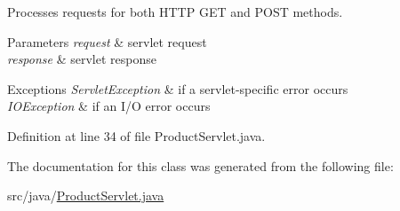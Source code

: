 Processes requests for both H\+T\+TP {\ttfamily G\+ET} and {\ttfamily P\+O\+ST} methods.


\begin{DoxyParams}{Parameters}
{\em request} & servlet request \\
\hline
{\em response} & servlet response \\
\hline
\end{DoxyParams}

\begin{DoxyExceptions}{Exceptions}
{\em Servlet\+Exception} & if a servlet-\/specific error occurs \\
\hline
{\em I\+O\+Exception} & if an I/O error occurs \\
\hline
\end{DoxyExceptions}


Definition at line 34 of file Product\+Servlet.\+java.



The documentation for this class was generated from the following file\+:\begin{DoxyCompactItemize}
\item 
src/java/\mbox{\hyperlink{_product_servlet_8java}{Product\+Servlet.\+java}}\end{DoxyCompactItemize}
